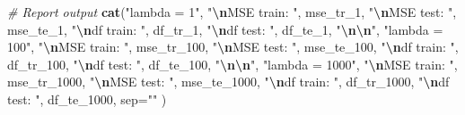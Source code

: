 \documentclass[
]{article}
\newenvironment{Shaded}{\begin{snugshade}}{\end{snugshade}}
\newcommand{\AttributeTok}[1]{\textcolor[rgb]{0.13,0.29,0.53}{#1}}
\newcommand{\CommentTok}[1]{\textcolor[rgb]{0.56,0.35,0.01}{\textit{#1}}}
\newcommand{\FunctionTok}[1]{\textcolor[rgb]{0.13,0.29,0.53}{\textbf{#1}}}
\newcommand{\NormalTok}[1]{#1}
\newcommand{\SpecialCharTok}[1]{\textcolor[rgb]{0.81,0.36,0.00}{\textbf{#1}}}
\newcommand{\StringTok}[1]{\textcolor[rgb]{0.31,0.60,0.02}{#1}}
\begin{document}
\begin{Shaded}
\begin{Highlighting}[]
\CommentTok{\# Report output}
\FunctionTok{cat}\NormalTok{(}\StringTok{"lambda = 1"}\NormalTok{,}
    \StringTok{"}\SpecialCharTok{\textbackslash{}n}\StringTok{MSE train: "}\NormalTok{, mse\_tr\_1,}
    \StringTok{"}\SpecialCharTok{\textbackslash{}n}\StringTok{MSE test: "}\NormalTok{, mse\_te\_1,}
    \StringTok{"}\SpecialCharTok{\textbackslash{}n}\StringTok{df train: "}\NormalTok{, df\_tr\_1,}
    \StringTok{"}\SpecialCharTok{\textbackslash{}n}\StringTok{df test: "}\NormalTok{, df\_te\_1,}
    \StringTok{"}\SpecialCharTok{\textbackslash{}n\textbackslash{}n}\StringTok{"}\NormalTok{,}
    \StringTok{"lambda = 100"}\NormalTok{,}
    \StringTok{"}\SpecialCharTok{\textbackslash{}n}\StringTok{MSE train: "}\NormalTok{, mse\_tr\_100,}
    \StringTok{"}\SpecialCharTok{\textbackslash{}n}\StringTok{MSE test: "}\NormalTok{, mse\_te\_100,}
    \StringTok{"}\SpecialCharTok{\textbackslash{}n}\StringTok{df train: "}\NormalTok{, df\_tr\_100,}
    \StringTok{"}\SpecialCharTok{\textbackslash{}n}\StringTok{df test: "}\NormalTok{, df\_te\_100,}
    \StringTok{"}\SpecialCharTok{\textbackslash{}n\textbackslash{}n}\StringTok{"}\NormalTok{,}
    \StringTok{"lambda = 1000"}\NormalTok{,}
    \StringTok{"}\SpecialCharTok{\textbackslash{}n}\StringTok{MSE train: "}\NormalTok{, mse\_tr\_1000,}
    \StringTok{"}\SpecialCharTok{\textbackslash{}n}\StringTok{MSE test: "}\NormalTok{, mse\_te\_1000,}
    \StringTok{"}\SpecialCharTok{\textbackslash{}n}\StringTok{df train: "}\NormalTok{, df\_tr\_1000,}
    \StringTok{"}\SpecialCharTok{\textbackslash{}n}\StringTok{df test: "}\NormalTok{, df\_te\_1000,}
    \AttributeTok{sep=}\StringTok{""}
\NormalTok{)}
\end{Highlighting}
\end{Shaded}
\end{document}
